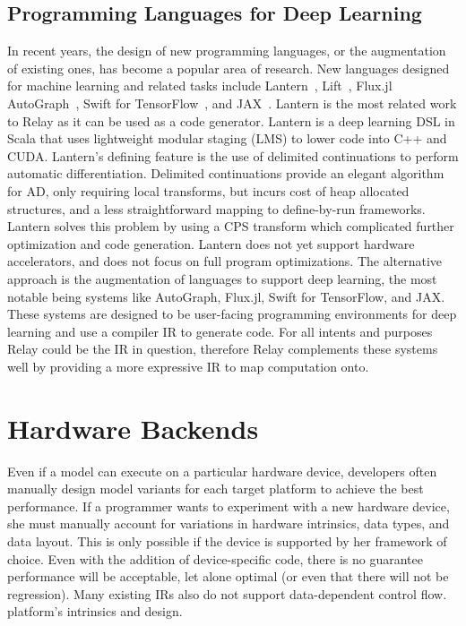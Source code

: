 \subsection{Programming Languages for Deep Learning}
\label{sec:pl_techniques_in_dl}

In recent years, the design of new programming languages,
    or the augmentation of existing ones, has become
    a popular area of research.
New languages designed for machine learning and related
    tasks include Lantern~\citep{lantern}, Lift~\citep{lift_lang}, Flux.jl~\citep{fluxjl}
    AutoGraph~\citep{moldovan2018autograph}, Swift for TensorFlow~\citep{tf_swift},
    and JAX~\citep{jax}.
Lantern \citep{lantern} is the most related work to Relay as it can
    be used as a code generator.
Lantern is a deep learning DSL in Scala
    that uses lightweight modular staging (LMS) to lower code into C++ and CUDA.
Lantern's defining feature is the use of delimited continuations to perform
    automatic differentiation.
Delimited continuations provide an elegant algorithm for AD,
    only requiring local transforms, but incurs cost of
    heap allocated structures, and a less straightforward
    mapping to define-by-run frameworks.
Lantern solves this problem by using a CPS transform which
    complicated further optimization and code generation.
Lantern does not yet support hardware accelerators, and
    does not focus on full program optimizations.
The alternative approach is the augmentation of languages to support deep learning,
  the most notable being systems like AutoGraph, Flux.jl, Swift for TensorFlow,
  and JAX.
These systems are designed to be user-facing programming
    environments for deep learning and use a compiler IR
    to generate code.
For all intents and purposes Relay could be the IR in
    question, therefore  Relay complements these systems well by
    providing a more expressive IR to map computation onto.

\section{Hardware Backends}

Even if a model can execute on
  a particular hardware device, developers
  often manually design model
  variants for each target platform
  to achieve the best performance.
If a programmer wants to experiment with a new hardware device,
  she must manually account for variations in hardware intrinsics, data
  types, and data layout.
This is only possible if the device is supported by her framework of choice.
Even with the addition of device-specific code,
  there is no guarantee performance will be acceptable, let alone optimal
  (or even that there will not be regression).
Many existing IRs also do not support data-dependent control flow.
  platform's intrinsics and design.


